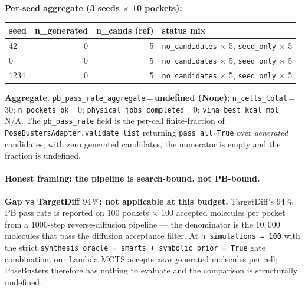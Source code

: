 \noindent\textbf{Per-seed aggregate (3 seeds $\times$ 10 pockets):}

\begin{center}
\small
\setlength{\tabcolsep}{4pt}
\begin{tabular}{lrrl}
\toprule
\textbf{seed} & \textbf{n\_generated} & \textbf{n\_cands (ref)} & \textbf{status mix} \\
\midrule
42   & 0 & 5 & \texttt{no\_candidates} $\times$ 5, \texttt{seed\_only} $\times$ 5 \\
0    & 0 & 5 & \texttt{no\_candidates} $\times$ 5, \texttt{seed\_only} $\times$ 5 \\
1234 & 0 & 5 & \texttt{no\_candidates} $\times$ 5, \texttt{seed\_only} $\times$ 5 \\
\bottomrule
\end{tabular}
\end{center}

\noindent\textbf{Aggregate.} \texttt{pb\_pass\_rate\_aggregate}\,=\,\textbf{undefined (None)};
\texttt{n\_cells\_total}\,=\,30; \texttt{n\_pockets\_ok}\,=\,0;
\texttt{physical\_jobs\_completed}\,=\,0; \texttt{vina\_best\_kcal\_mol}\,=\,N/A.
The \texttt{pb\_pass\_rate} field is the per-cell finite-fraction
of \texttt{PoseBustersAdapter.validate\_list} returning
\texttt{pass\_all=True} over \emph{generated} candidates; with
zero generated candidates, the numerator is empty and the
fraction is undefined.

\paragraph{Honest framing: the pipeline is search-bound, not PB-bound.}
\textbf{Gap vs TargetDiff $94\,\%$: not applicable at this
budget.}  TargetDiff's $94\,\%$ PB pass rate
\cite{guan2023targetdiff, buttenschoen2024posebusters} is
reported on $100$ pockets $\times$ $100$ accepted molecules per
pocket from a $1000$-step reverse-diffusion pipeline --- the
denominator is the $10{,}000$ molecules that pass the
diffusion acceptance filter.  At \texttt{n\_simulations\,=\,100}
with the strict
\texttt{synthesis\_oracle\,=\,smarts + symbolic\_prior\,=\,True}
gate combination, our Lambda MCTS accepts \emph{zero} generated
molecules per cell; PoseBusters therefore has nothing to
evaluate and the comparison is structurally undefined.

